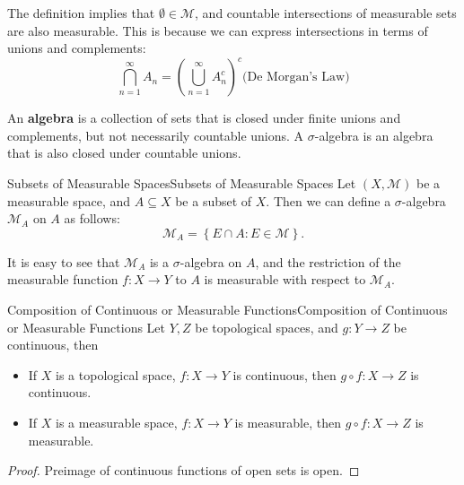 \documentclass[../main.tex]{subfiles}
\begin{document}
\begin{remark}
The definition implies that $\emptyset \in \mathcal{M}$, and countable intersections of measurable sets are also measurable. This is because we can express intersections in terms of unions and complements:
\begin{equation*}
	\bigcap_{n=1}^{\infty} A_n = \left(\bigcup_{n=1}^{\infty} A_n^c\right)^c \text{(De Morgan's Law)}
\end{equation*}

An \textbf{algebra} is a collection of sets that is closed under finite unions and complements, but not necessarily countable unions. A $\sigma$-algebra is an algebra that is also closed under countable unions.
\end{remark}

\begin{theorem}{Subsets of Measurable Spaces}{Subsets of Measurable Spaces}
	Let $(X, \mathcal{M})$ be a measurable space, and $A\subseteq X$ be a subset of $X$. Then we can define a $\sigma$-algebra $\mathcal{M}_A$ on $A$ as follows:
	\begin{equation*}
		\mathcal{M}_A = \left\{ E \cap A: E\in \mathcal{M} \right\}.
	\end{equation*}
\end{theorem}

It is easy to see that $\mathcal{M}_A$ is a $\sigma$-algebra on $A$, and the restriction of the measurable function $f: X \rightarrow Y$ to $A$ is measurable with respect to $\mathcal{M}_A$.

\begin{theorem}{Composition of Continuous or Measurable Functions}{Composition of Continuous or Measurable Functions}
Let $Y,Z$ be topological spaces, and $g:Y \rightarrow Z$ be continuous, then
\begin{itemize}
\item If $X$ is a topological space, $f:X \rightarrow Y$ is continuous, then $g \circ f: X \rightarrow Z$ is continuous.
\item If $X$ is a measurable space, $f:X \rightarrow Y$ is measurable, then $g \circ f: X \rightarrow Z$ is measurable.
\end{itemize}
\end{theorem}
\begin{proof}
Preimage of continuous functions of open sets is open.
\end{proof}
\end{document}
